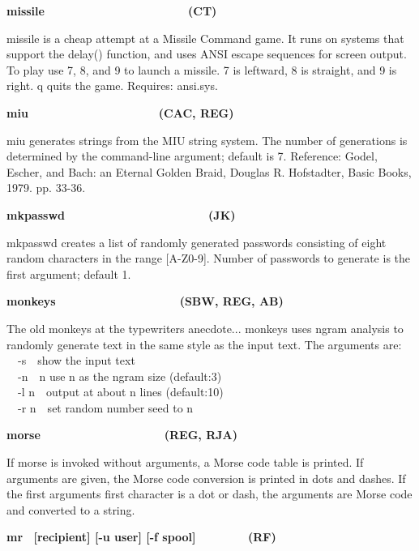 {{\sffamily\bfseries
missile\ \ \ \ \ \ \ \ \ \ \ \ \ \ \ \ \ \ \ \  \ \ (CT)}

\textsf{missile} is a cheap attempt at a Missile Command game. It runs
on systems that support the \textsf{delay()} function, and uses ANSI
escape sequences for screen output. To play use 7, 8, and 9 to launch a
missile. 7 is leftward, 8 is straight, and 9 is right. q quits the
game. Requires: \textsf{ansi.sys}. 

{\sffamily\bfseries
miu\ \ \ \ \ \ \ \ \ \ \ \ \ \ \ \ \ \ \ \ (CAC, REG)}

\textsf{miu} generates strings from the MIU string system. The number of
generations is determined by the command-line argument; default is 7.
Reference: Godel, Escher, and Bach: an Eternal Golden Braid, Douglas R.
Hofstadter, Basic Books, 1979. pp. 33-36. 

{\sffamily\bfseries
mkpasswd\ \ \ \ \ \ \ \ \ \ \ \ \ \ \ \ \ \ \ \  \ \ (JK)}

\textsf{mkpasswd} creates a list of randomly generated
passwords consisting of eight random characters in the
range [A-Z0-9]. Number of passwords to generate is the first argument;
default 1.

{\sffamily\bfseries
monkeys\ \ \ \ \ \ \ \ \ \ \ \ \ \ \ \  \ \ \ (SBW, REG, AB)}

The old monkeys at the typewriters anecdote... \textsf{monkeys} uses
ngram analysis to randomly generate text in the same
{\textquotesingle}style{\textquotesingle} as the input text. The
arguments are:\\
\ \ \textsf{{}-s}\ \ show the input text\\
\ \ \textsf{{}-n}\ \ n use n as the ngram size (default:3)\\
\ \ \textsf{{}-l n}\ \ output at about n lines (default:10)\\
\ \ \textsf{{}-r n}\ \ set random number seed to n

{\sffamily\bfseries
morse\ \ \ \ \ \ \ \ \ \ \ \ \ \ \ \ \ \  \ (REG, RJA)}

If \textsf{morse} is invoked without arguments, a Morse code table is printed. If arguments are given, the Morse
code conversion is printed in dots and dashes. If the first
argument{\textquotesingle}s first character is a dot or dash, the
arguments are Morse code and converted to a string.

{\sffamily\bfseries
mr \ \textrm{\textmd{[recipient] [-u user] [-f spool]\ \ \ \ \ \ \ \ 
}}(RF)}

}
